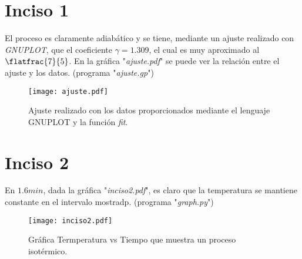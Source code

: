 
\section{Inciso 1}

El proceso es claramente adiabático y se tiene, mediante un ajuste realizado
   con \textit{GNUPLOT}, que el coeficiente $\gamma = 1.309$, el cual es muy aproximado al
   $\flatfrac{7}{5}$. En la gráfica "\textit{ajuste.pdf}" se puede ver la relación entre el ajuste
   y los datos. (programa "\textit{ajuste.gp}")
   
\begin{figure}[h]
	   \centering
	   \texttt{[image: ajuste.pdf]}
	   \caption{Ajuste realizado con los datos proporcionados mediante el lenguaje GNUPLOT y la función \textit{fit}.}
	   \label{inciso1}
\end{figure}

\section{Inciso 2}

En $1.6 min$, dada la gráfica "\textit{inciso2.pdf}", es claro que la temperatura
   se mantiene constante en el intervalo mostradp. (programa "\textit{graph.py}")

\begin{figure}[H]
	\centering
	\texttt{[image: inciso2.pdf]}
	\caption{Gráfica Termperatura vs Tiempo que muestra un proceso isotérmico.}
\end{figure}






























